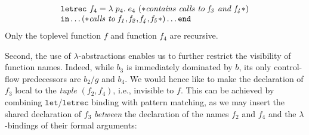 \begin{equation}
\begin{array}{l}
\begin{array}{l}
\begin{array}[t]{l}
\begin{array}[t]{l}
\begin{array}[t]{l}
                \begin{array}[t]{l}
                  \mathtt{letrec}\ f_4 = \lambda\; p_4.\; e_4\
                    (* \mathit{contains\ calls\ to\ f_3\ and\ f_4}*) \\
                   \mathtt{in} \ldots 
                      (* \mathit{calls\ to\ f_1, f_2, f_4, f_5}*)
                   \ldots \mathtt{end}
                \end{array}
              \end{array}
            \end{array}
          \end{array}
        \end{array}
  \end{array}
\end{equation}
Only the toplevel function $f$ and function $f_4$ are recursive.

Second, the use of $\lambda$-abstractions enables us to further
restrict the visibility of function names. Indeed, while $b_3$ is
immediately dominated by $b$, its only control-flow predecessors are
$b_2/g$ and $b_4$. We would hence like to make the declaration of
$f_3$ local to the \emph{tuple} $(f_2, f_4)$, i.e., invisible to $f$.
This can be achieved by combining $\mathtt{let}$/$\mathtt{letrec}$
binding with pattern matching, as we may insert the shared declaration
of $f_3$ \emph{between} the declaration of the names $f_2$ and $f_4$
and the $\lambda$-bindings of their formal arguments:

